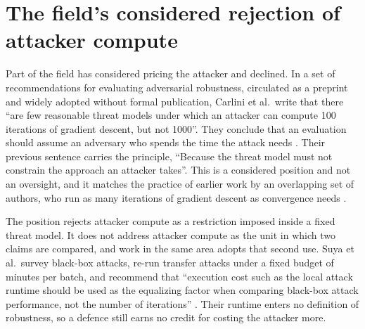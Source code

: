 \section{The field's considered rejection of attacker compute}
\label{sec:findings}

Part of the field has considered pricing the attacker and declined. In a set
of recommendations for evaluating adversarial robustness, circulated as a
preprint and widely adopted without formal publication, Carlini et al.\ write
that there ``are few reasonable threat models under which an attacker can
compute 100 iterations of gradient descent, but not 1000''. They conclude that
an evaluation should assume an adversary who spends the time the attack needs
\cite{CAPBRTGMK19}. Their previous sentence carries the principle, ``Because the threat model must
not constrain the approach an attacker takes''. This is a considered position
and not an oversight, and it matches the practice of earlier work by an
overlapping set of authors, who run as many iterations of gradient descent as
convergence needs \cite{ACW18}.

The position rejects attacker compute as a restriction imposed inside a fixed
threat model. It does not address attacker compute as the unit in which two
claims are compared, and work in the same area adopts that second use. Suya et
al.\ survey \BBattacks{} black-box attacks, re-run \BBrerun{} transfer attacks
under a fixed budget of \BBminutes{} minutes per batch, and recommend that
``execution cost such as the local attack runtime should be used as the
equalizing factor when comparing black-box attack performance, not the number
of iterations'' \cite{SSZHTE24}. Their runtime enters no definition of
robustness, so a defence still earns no credit for costing the attacker more.
